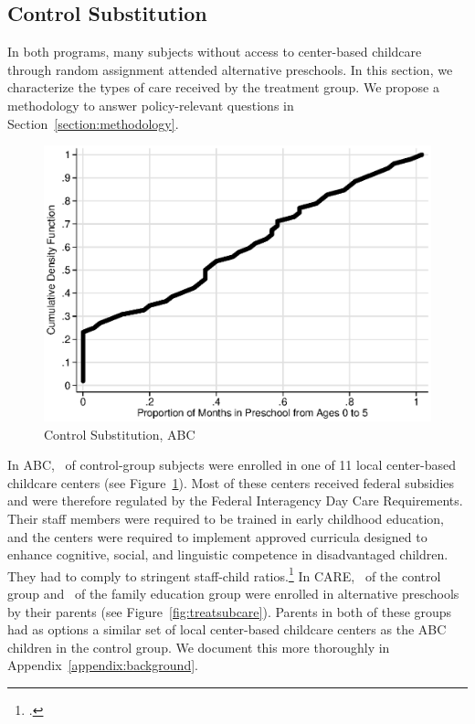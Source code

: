 \subsection{Control Substitution}

\noindent In both programs, many subjects without access to center-based childcare through random assignment attended alternative preschools. In this section, we characterize the types of care received by the treatment group. We propose a methodology to answer policy-relevant questions in Section~\ref{section:methodology}.\\

\begin{figure}[H]
		\caption{Control Substitution, ABC} \label{fig:treatsubabc}
		\includegraphics[width=.9\columnwidth]{output/abc_controlcontamination_months.eps}
\end{figure}

\noindent In ABC, \treatsubsabc\ of control-group subjects were enrolled in one of 11 local center-based childcare centers (see Figure~\ref{fig:treatsubabc}). Most of these centers received federal subsidies and were therefore regulated by the Federal Interagency Day Care Requirements. Their staff members were required to be trained in early childhood education, and the centers were required to implement approved curricula designed to enhance cognitive, social, and linguistic competence in disadvantaged children. They had to comply to stringent staff-child ratios.\footnote{\citet{Burchinal_etal_1989_CD_Daycare-Pre-K-Dev}.} In CARE, \treatsubscarec\ of the control group and \treatsubscaref\ of the family education group were enrolled in alternative preschools by their parents (see Figure~\ref{fig:treatsubcare}). Parents in both of these groups had as options a similar set of local center-based childcare centers as the ABC children in the control group. We document this more thoroughly in Appendix~\ref{appendix:background}.

